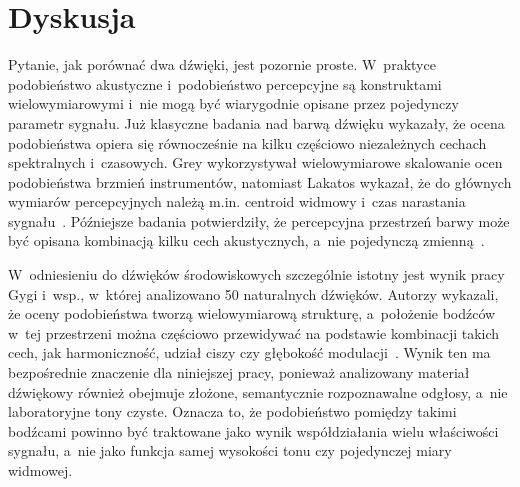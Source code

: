\documentclass{article}
\begin{document}
\section{Dyskusja}

Pytanie, jak porównać dwa dźwięki, jest pozornie proste. W~praktyce podobieństwo akustyczne i~podobieństwo percepcyjne są konstruktami wielowymiarowymi i~nie mogą być wiarygodnie opisane przez pojedynczy parametr sygnału. Już klasyczne badania nad barwą dźwięku wykazały, że ocena podobieństwa opiera się równocześnie na kilku częściowo niezależnych cechach spektralnych i~czasowych. Grey wykorzystywał wielowymiarowe skalowanie ocen podobieństwa brzmień instrumentów, natomiast Lakatos wykazał, że do głównych wymiarów percepcyjnych należą m.in. centroid widmowy i~czas narastania sygnału~\cite{Grey1977Timbre,Lakatos2000Timbre}. Późniejsze badania potwierdziły, że percepcyjna przestrzeń barwy może być opisana kombinacją kilku cech akustycznych, a~nie pojedynczą zmienną~\cite{Elliott2013TimbreDimensions}.

W~odniesieniu do dźwięków środowiskowych szczególnie istotny jest wynik pracy Gygi i~wsp., w~której analizowano 50 naturalnych dźwięków. Autorzy wykazali, że oceny podobieństwa tworzą wielowymiarową strukturę, a~położenie bodźców w~tej przestrzeni można częściowo przewidywać na podstawie kombinacji takich cech, jak harmoniczność, udział ciszy czy głębokość modulacji~\cite{Gygi2007EnvironmentalSounds}. Wynik ten ma bezpośrednie znaczenie dla niniejszej pracy, ponieważ analizowany materiał dźwiękowy również obejmuje złożone, semantycznie rozpoznawalne odgłosy, a~nie laboratoryjne tony czyste. Oznacza to, że podobieństwo pomiędzy takimi bodźcami powinno być traktowane jako wynik współdziałania wielu właściwości sygnału, a~nie jako funkcja samej wysokości tonu czy pojedynczej miary widmowej.
\end{document}
